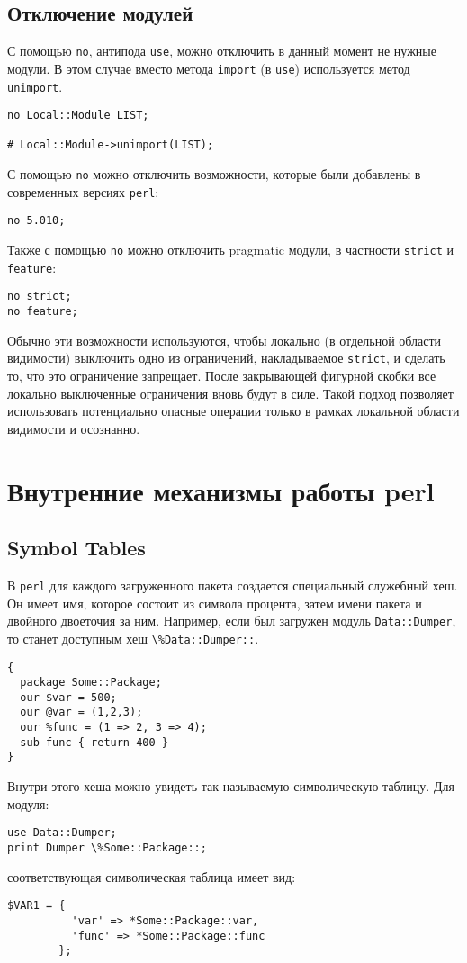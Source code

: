 \subsection{Отключение модулей} %
С помощью \verb|no|, антипода \verb|use|, можно отключить в данный момент не нужные модули. В этом случае вместо метода \verb|import| (в \verb|use|) используется метод \verb|unimport|.
\begin{verbatim}
no Local::Module LIST;

# Local::Module->unimport(LIST);
\end{verbatim}
С помощью \verb|no| можно отключить возможности, которые были добавлены в современных версиях \verb|perl|:
\begin{verbatim}
no 5.010;
\end{verbatim}
Также с помощью \verb|no| можно отключить pragmatic модули, в частности \verb|strict| и \verb|feature|:
\begin{verbatim}
no strict;
no feature;
\end{verbatim}
Обычно эти возможности используются, чтобы локально (в отдельной области видимости) выключить одно из ограничений, накладываемое \verb|strict|, и сделать то, что это ограничение запрещает. После закрывающей фигурной скобки все локально выключенные ограничения вновь будут в силе. Такой подход позволяет использовать потенциально опасные операции только в рамках локальной области видимости и осознанно.


\section{Внутренние механизмы работы perl}
\subsection{Symbol Tables} %
В \verb|perl| для каждого загруженного пакета создается специальный служебный хеш. Он имеет имя, которое состоит из символа процента, затем имени пакета и двойного двоеточия за ним. Например, если был загружен модуль \verb|Data::Dumper|, то станет доступным хеш \verb|\%Data::Dumper::|.
\begin{verbatim}
{
  package Some::Package;
  our $var = 500;
  our @var = (1,2,3);
  our %func = (1 => 2, 3 => 4);
  sub func { return 400 }
}
\end{verbatim}
Внутри этого хеша можно увидеть так называемую символическую таблицу. Для модуля:
\begin{verbatim}
use Data::Dumper;
print Dumper \%Some::Package::;
\end{verbatim}
соответствующая символическая таблица имеет вид:
\begin{verbatim}
$VAR1 = {
          'var' => *Some::Package::var,
          'func' => *Some::Package::func
        };
\end{verbatim}

